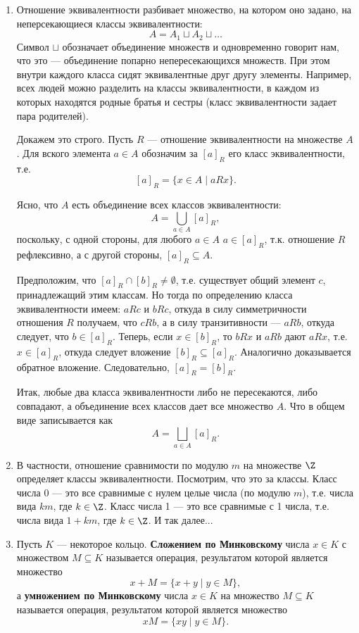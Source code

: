 \begin{enumerate}
\item Отношение эквивалентности разбивает множество, на котором оно задано, на неперсекающиеся классы эквивалентности:
$$
A = A_1\sqcup A_2\sqcup\dots
$$
Символ $\sqcup$ обозначает объединение множеств и одновременно говорит нам, что это --- объединение попарно непересекающихся множеств.
При этом внутри каждого класса сидят эквивалентные друг другу элементы. Например, всех людей можно разделить на классы эквивалентности, в каждом из которых находятся родные братья и сестры (класс эквивалентности задает пара родителей).

Докажем это строго. Пусть $R$ --- отношение эквивалентности на множестве $A$. Для вского элемента $a\in A$ обозначим за $[a]_R$ его класс эквивалентности, т.е.
$$
[a]_R = \{x\in A\mid aRx\}.
$$

Ясно, что $A$ есть объединение всех классов эквивалентности:
$$
A=\bigcup_{a\in A}[a]_R,
$$
поскольку, с одной стороны, для любого $a\in A$ $a\in[a]_R$, т.к. отношение $R$ рефлексивно, а с другой стороны, $[a]_R\subseteq A$.

Предположим, что $[a]_R\cap [b]_R\ne\emptyset$, т.е. существует общий элемент $c$, принадлежащий этим классам. Но тогда по определению класса эквивалентности имеем: $aRc$ и $bRc$, откуда в силу симметричности отношения $R$ получаем, что $cRb$, а в силу транзитивности --- $aRb$, откуда следует, что $b\in[a]_R$. Теперь, если $x\in[b]_R$, то $bRx$ и $aRb$ дают $aRx$, т.е. $x\in[a]_R$, откуда следует вложение $[b]_R\subseteq[a]_R$. Аналогично доказывается обратное вложение. Следовательно, $[a]_R=[b]_R$.

Итак, любые два класса эквивалентности либо не пересекаются, либо совпадают, а объединение всех классов дает все множество $A$. Что в общем виде записывается как
$$
A = \bigsqcup_{a\in A}[a]_R.
$$

\item В частности, отношение сравнимости по модулю $m$ на множестве $\Z$ определяет классы эквивалентности.
Посмотрим, что это за классы. Класс числа 0 --- это все сравнимые с нулем целые числа (по модулю $m$), т.е. числа вида $km$, где $k\in\Z$. Класс числа 1 --- это все сравнимые с 1 числа, т.е. числа вида $1+km$, где $k\in\Z$. И так далее...

\item Пусть $K$ --- некоторое кольцо. \textbf{Сложением по Минковскому} числа $x\in K$ с множеством $M\subseteq K$ называется операция, результатом которой является множество
$$
x+M = \{x+y\mid y\in M\},
$$
а \textbf{умножением по Минковскому} числа $x\in K$ на множество $M\subseteq K$ называется операция, результатом которой является множество
$$
xM = \{xy\mid y\in M\}.
$$


\end{enumerate}

